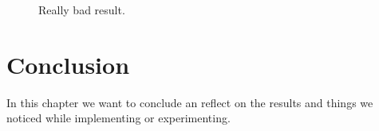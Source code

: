 \documentclass[12pt, a4paper]{article}
\begin{document}
\begin{figure}
        \caption{Really bad result.}
        \label{fig:worstImage}
\end{figure}

\section{Conclusion}
In this chapter we want to conclude an reflect on the results and things we noticed while implementing or experimenting.
\end{document}

